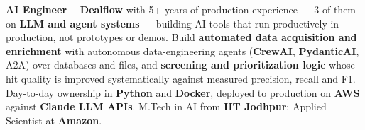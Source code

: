 \documentclass[letter,10pt]{article}
\begin{document}

\textbf{AI Engineer – Dealflow} with 5+ years of production experience — 3 of them on \textbf{LLM and agent systems} — building AI tools that run productively in production, not prototypes or demos.
Build \textbf{automated data acquisition and enrichment} with autonomous data-engineering agents (\textbf{CrewAI}, \textbf{PydanticAI}, A2A) over databases and files, and \textbf{screening and prioritization logic} whose hit quality is improved systematically against measured precision, recall and F1.
Day-to-day ownership in \textbf{Python} and \textbf{Docker}, deployed to production on \textbf{AWS} against \textbf{Claude LLM APIs}.
M.Tech in AI from \textbf{IIT Jodhpur}; Applied Scientist at \textbf{Amazon}.
\end{document}
